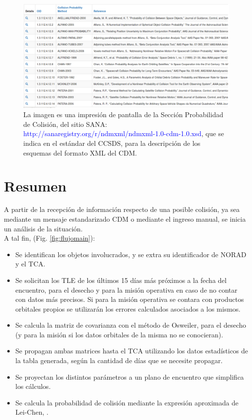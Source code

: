 \begin{figure}[!h]
\centering
\includegraphics[width=\textwidth]{imagenes/sanaPoCmetodos}
\caption[M\'etodos de c\'alculo de PoC - (Sitio Web SANA)]{ La imagen es una impresi\'on de pantalla de la Secci\'on Probabilidad de Colisi\'on, del sitio SANA: \textcolor{blue}{http://sanaregistry.org/r/ndmxml/ndmxml-1.0-cdm-1.0.xsd}, que se indica en el est\'andar del CCSDS, para la descripci\'on de los esquemas del formato XML del CDM.}
\label{fig:pagsana}
\end{figure}

\section{Resumen}
A partir de la recepci\'on de informaci\'on respecto de una posible colisi\'on, ya sea mediante un mensaje estandarizado CDM o mediante el ingreso manual, se inicia un an\'alisis de la situaci\'on.\\
A tal fin, (Fig. \ref{fig:flujomain}):\\

\begin{itemize}
\itemsep0em
\item Se identifican los objetos involucrados, y se extra su identificador de NORAD y el TCA.
\item Se solicitan los TLE de los \'ultimos 15 d\'ias m\'as pr\'oximos a la fecha del encuentro, para el desecho y para la misi\'on operativa en caso de no contar con datos m\'as precisos. Si para la misi\'on operativa se contara con productos orbitales propios se utilizar\'an los errores calculados asociados a los mismos.
\item Se calcula la matriz de covarianza con el m\'etodo de Osweiler, \citep{osweiler} para el desecho (y para la misi\'on si los datos orbitales de la misma no se conocieran).
\item Se propagan ambas matrices hasta el TCA utilizando los datos estad\'isticos de la tabla generada, seg\'un la cantidad de d\'ias que se necesite propagar.
\item Se proyectan los distintos par\'ametros a un plano de encuentro que simplifica los c\'alculos.
\item Se calcula la probabilidad de colisi\'on mediante la expresi\'on aproximada de Lei-Chen, \citep{leichen}.
\end{itemize}

